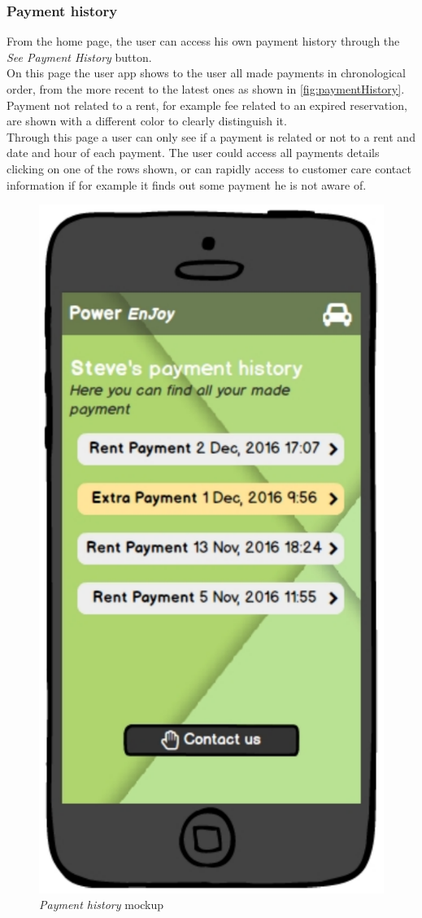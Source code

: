 \subsubsection{Payment history}

From the home page, the user can access his own payment history through the \emph{See Payment History} button. \\

On this page the user app shows to the user all made payments in chronological order, from the more recent to the latest ones as shown in \autoref{fig:paymentHistory}. \\

Payment not related to a rent, for example fee related to an expired reservation, are shown with a different color to clearly distinguish it. \\

Through this page a user can only see if a payment is related or not to a rent and date and hour of each payment. The user could access all payments details clicking on one of the rows shown, or can rapidly access to customer care contact information if for example it finds out some payment he is not aware of. \\


\begin{figure}[h]
			\centering
			\includegraphics[width=0.4\linewidth]{mockups/paymentHistory}
			\caption{
				\label{fig:paymentHistory} 
				\emph{Payment history} mockup
			}
		\end{figure}
\clearpage

